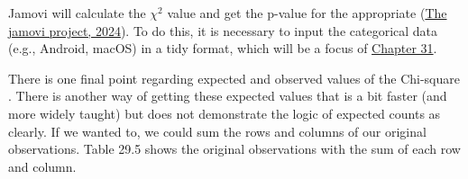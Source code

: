 \documentclass[
  openany]{krantz}
\begin{document}
Jamovi will calculate the \(\chi^{2}\) value and get the p-value for the appropriate  (\protect\hyperlink{ref-Jamovi2022}{The jamovi project, 2024}).
To do this, it is necessary to input the categorical data (e.g., Android, macOS) in a tidy format, which will be a focus of \protect\hyperlink{Chapter_31}{Chapter 31}.

There is one final point regarding expected and observed values of the Chi-square .
There is another way of getting these expected values that is a bit faster (and more widely taught) but does not demonstrate the logic of expected counts as clearly.
If we wanted to, we could sum the rows and columns of our original observations.
Table 29.5 shows the original observations with the sum of each row and column.
\end{document}
